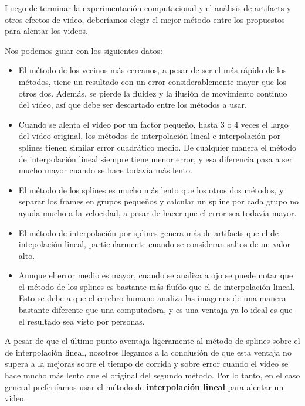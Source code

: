 Luego de terminar la experimentaci\'on computacional y el an\'alisis de artifacts y otros efectos de video, deber\'iamos elegir el mejor m\'etodo entre los propuestos para alentar los videos.

Nos podemos guiar con los siguientes datos:

\vspace{-2ex}

\begin{itemize}
	\item El m\'etodo de los vecinos m\'as cercanos, a pesar de ser el m\'as r\'apido de los m\'etodos, tiene un resultado con un error considerablemente mayor que los otros dos. Adem\'as, se pierde la fluidez y la ilusi\'on de movimiento continuo del video, as\'i que debe ser descartado entre los m\'etodos a usar.
	\item Cuando se alenta el video por un factor peque\~no, hasta 3 o 4 veces el largo del video original, los m\'etodos de interpolaci\'on lineal e interpolaci\'on por splines tienen similar error cuadr\'atico medio. De cualquier manera el m\'etodo de interpolaci\'on lineal siempre tiene menor error, y esa diferencia pasa a ser mucho mayor cuando se hace todav\'ia m\'as lento.
	\item El m\'etodo de los splines es mucho m\'as lento que los otros dos m\'etodos, y separar los frames en grupos peque\~nos y calcular un spline por cada grupo no ayuda mucho a la velocidad, a pesar de hacer que el error sea todav\'ia mayor.
	\item El m\'etodo de interpolaci\'on por splines genera m\'as de artifacts que el de intepolaci\'on lineal, particularmente cuando se consideran saltos de un valor alto.
	\item Aunque el error medio es mayor, cuando se analiza a ojo se puede notar que el m\'etodo de los splines es bastante m\'as flu\'ido que el de interpolaci\'on lineal. Esto se debe a que el cerebro humano analiza las imagenes de una manera bastante diferente que una computadora, y es una ventaja ya lo ideal es que el resultado sea visto por personas.
\end{itemize}

A pesar de que el \'ultimo punto aventaja ligeramente al m\'etodo de splines sobre el de interpolaci\'on lineal, nosotros llegamos a la conclusi\'on de que esta ventaja no supera a la mejoras sobre el tiempo de corrida y sobre error cuando el video se hace mucho m\'as lento que el original del segundo m\'etodo. Por lo tanto, en el caso general preferi\'iamos usar el m\'etodo de \textbf{interpolaci\'on lineal} para alentar un video.

